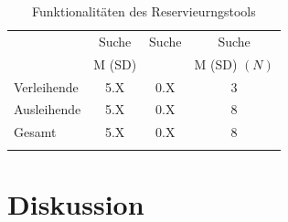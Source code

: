 \begin{table}[h]
  \centering
  \caption{Funktionalitäten des Reservieurngstools}
  \begin{tabular}{lccc}
    \arrayrulecolor{maincolor}\hline    
     & \sffamily\color{maincolor} Suche & \sffamily\color{maincolor} Suche  &    \sffamily\color{maincolor} Suche \\
     & \sffamily\color{maincolor} M (SD) &
     & \sffamily\color{maincolor} M (SD) 
    $(N)$ \\
    \arrayrulecolor{maincolor}\hline
    Verleihende                              & 5.X & 0.X & 3 \\
    Ausleihende                              & 5.X & 0.X & 8 \\
    Gesamt                                   & 5.X & 0.X & 8 \\
    \arrayrulecolor{maincolor}\hline
  \end{tabular}
  \label{table:fkt}
\end{table}


\section{Diskussion}